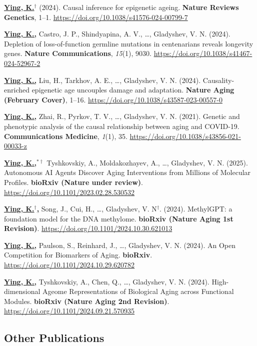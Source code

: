 \documentclass[
  11pt,
]
{article}
\begin{document}
\textbf{\underline{Ying, K.$^{\dagger}$}} (2024). Causal inference for
epigenetic ageing. \textbf{Nature Reviews Genetics}, 1--1.
\url{https://doi.org/10.1038/s41576-024-00799-7}

\textbf{\underline{Ying, K.,}} Castro, J. P., Shindyapina, A. V.,
\ldots, Gladyshev, V. N. (2024). Depletion of loss-of-function germline
mutations in centenarians reveals longevity genes. \textbf{Nature
Communications}, \emph{15}(1), 9030.
\url{https://doi.org/10.1038/s41467-024-52967-2}

\textbf{\underline{Ying, K.,}} Liu, H., Tarkhov, A. E., \ldots,
Gladyshev, V. N. (2024). Causality-enriched epigenetic age uncouples
damage and adaptation. \textbf{Nature Aging (February Cover)}, 1--16.
\url{https://doi.org/10.1038/s43587-023-00557-0}

\textbf{\underline{Ying, K.,}} Zhai, R., Pyrkov, T. V., \ldots,
Gladyshev, V. N. (2021). Genetic and phenotypic analysis of the causal
relationship between aging and COVID-19. \textbf{Communications
Medicine}, \emph{1}(1), 35.
\url{https://doi.org/10.1038/s43856-021-00033-z}

\textbf{\underline{Ying, K.,$^{*\dagger}$}} Tyshkovskiy, A.,
Moldakozhayev, A., \ldots, Gladyshev, V. N. (2025). Autonomous AI Agents
Discover Aging Interventions from Millions of Molecular Profiles.
\textbf{bioRxiv (Nature under review)}.
\url{https://doi.org/10.1101/2023.02.28.530532}

\textbf{\underline{Ying, K.$^{\dagger}$,}} Song, J., Cui, H., \ldots,
Gladyshev, V. N\(^{\dagger}\). (2024). MethylGPT: a foundation model for
the DNA methylome. \textbf{bioRxiv (Nature Aging 1st Revision)}.
\url{https://doi.org/10.1101/2024.10.30.621013}

\textbf{\underline{Ying, K.,}} Paulson, S., Reinhard, J., \ldots,
Gladyshev, V. N. (2024). An Open Competition for Biomarkers of Aging.
\textbf{bioRxiv}. \url{https://doi.org/10.1101/2024.10.29.620782}

\textbf{\underline{Ying, K.,}} Tyshkovskiy, A., Chen, Q., \ldots,
Gladyshev, V. N. (2024). High-dimensional Ageome Representations of
Biological Aging across Functional Modules. \textbf{bioRxiv (Nature
Aging 2nd Revision)}. \url{https://doi.org/10.1101/2024.09.21.570935}

\subsection{Other Publications}\label{other-publications}
\end{document}

